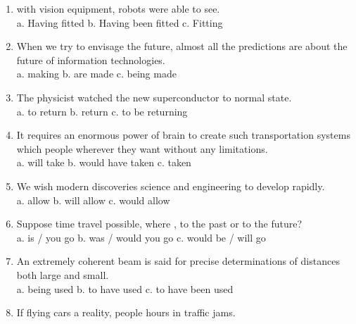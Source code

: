 \begin{enumerate}
      \item \underline{\hspace{2cm}} with vision equipment, robots were able to see.\\
            a. Having fitted \hfill b. Having been fitted \hfill c. Fitting
      \item When we try to envisage the future, almost all the predictions \underline{\hspace{2cm}} are about the future of information technologies.\\
            a. making \hfill b. are made \hfill c. being made
      \item The physicist watched the new superconductor \underline{\hspace{2cm}} to normal state.\\
            a. to return \hfill b. return \hfill c. to be returning
      \item It requires an enormous power of brain to create such transportation systems which \underline{\hspace{2cm}} people wherever they want without any limitations.\\
            a. will take \hfill b. would have taken \hfill c. taken
      \item We wish modern discoveries \underline{\hspace{2cm}} science and engineering to develop rapidly.\\
            a. allow \hfill b. will allow \hfill c. would allow
      \item Suppose time travel \underline{\hspace{2cm}} possible, where \underline{\hspace{2cm}} , to the past or to the future?\\
            a. is / you go \hfill b. was / would you go \hfill c. would be / will go
      \item An extremely coherent beam is said \underline{\hspace{2cm}} for precise determinations of distances both large and small.\\
            a. being used \hfill b. to have used \hfill c. to have been used
      \item If flying cars \underline{\hspace{2cm}} a reality, people \underline{\hspace{2cm}} hours in traffic jams.\\

\end{enumerate}
